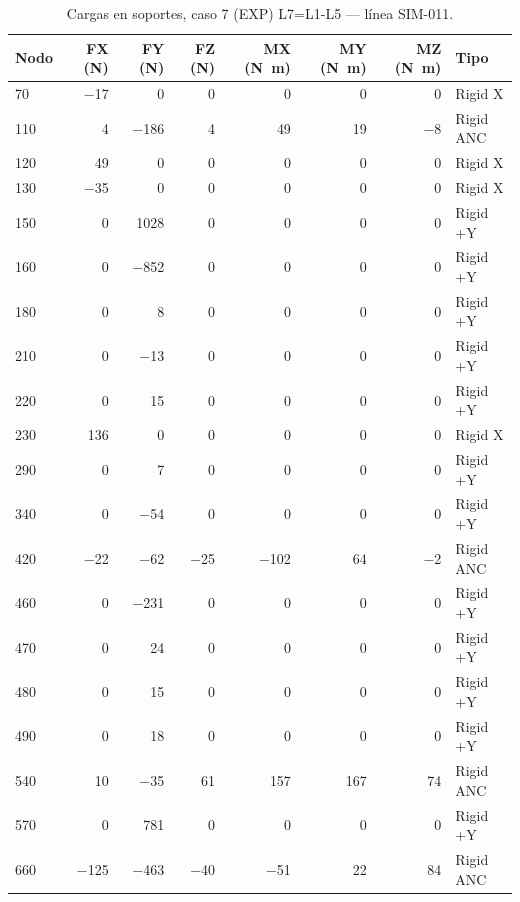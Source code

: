 \begin{table}[htbp]
  \centering
  \footnotesize
  \caption{Cargas en soportes, caso 7 (EXP) L7=L1-L5 — línea SIM-011.}
  \label{tab:restricciones-exp}
  \begin{tabular}{lrrrrrrl}
    \toprule
    Nodo & FX (\si{N}) & FY (\si{N}) & FZ (\si{N}) & MX (\si{N.m}) & MY (\si{N.m}) & MZ (\si{N.m}) & Tipo \\
    \midrule
    70 & \num{-17} & \num{0} & \num{0} & \num{0} & \num{0} & \num{0} & Rigid X \\
    110 & \num{4} & \num{-186} & \num{4} & \num{49} & \num{19} & \num{-8} & Rigid ANC \\
    120 & \num{49} & \num{0} & \num{0} & \num{0} & \num{0} & \num{0} & Rigid X \\
    130 & \num{-35} & \num{0} & \num{0} & \num{0} & \num{0} & \num{0} & Rigid X \\
    150 & \num{0} & \num{1028} & \num{0} & \num{0} & \num{0} & \num{0} & Rigid +Y \\
    160 & \num{0} & \num{-852} & \num{0} & \num{0} & \num{0} & \num{0} & Rigid +Y \\
    180 & \num{0} & \num{8} & \num{0} & \num{0} & \num{0} & \num{0} & Rigid +Y \\
    210 & \num{0} & \num{-13} & \num{0} & \num{0} & \num{0} & \num{0} & Rigid +Y \\
    220 & \num{0} & \num{15} & \num{0} & \num{0} & \num{0} & \num{0} & Rigid +Y \\
    230 & \num{136} & \num{0} & \num{0} & \num{0} & \num{0} & \num{0} & Rigid X \\
    290 & \num{0} & \num{7} & \num{0} & \num{0} & \num{0} & \num{0} & Rigid +Y \\
    340 & \num{0} & \num{-54} & \num{0} & \num{0} & \num{0} & \num{0} & Rigid +Y \\
    420 & \num{-22} & \num{-62} & \num{-25} & \num{-102} & \num{64} & \num{-2} & Rigid ANC \\
    460 & \num{0} & \num{-231} & \num{0} & \num{0} & \num{0} & \num{0} & Rigid +Y \\
    470 & \num{0} & \num{24} & \num{0} & \num{0} & \num{0} & \num{0} & Rigid +Y \\
    480 & \num{0} & \num{15} & \num{0} & \num{0} & \num{0} & \num{0} & Rigid +Y \\
    490 & \num{0} & \num{18} & \num{0} & \num{0} & \num{0} & \num{0} & Rigid +Y \\
    540 & \num{10} & \num{-35} & \num{61} & \num{157} & \num{167} & \num{74} & Rigid ANC \\
    570 & \num{0} & \num{781} & \num{0} & \num{0} & \num{0} & \num{0} & Rigid +Y \\
    660 & \num{-125} & \num{-463} & \num{-40} & \num{-51} & \num{22} & \num{84} & Rigid ANC \\
    \bottomrule
  \end{tabular}
\end{table}

